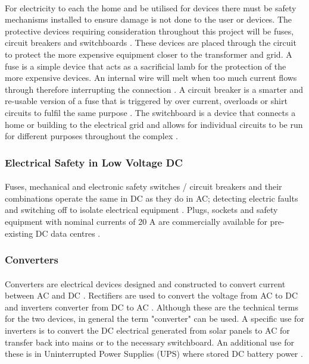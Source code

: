 \paragraph{}
For electricity to each the home and be utilised for devices there must be safety mechanisms installed to ensure damage is not done to the user or devices. The protective devices requiring consideration throughout this project will be fuses, circuit breakers and switchboards \cite{UnitedStatesDepartmentoftheInterior2000}. These devices are placed through the circuit to protect the more expensive equipment closer to the transformer and grid. A fuse is a simple device that acts as a sacrificial lamb for the protection of the more expensive devices. An internal wire will melt when too much current flows through therefore interrupting the connection \cite{UnitedStatesDepartmentoftheInterior2000}. A circuit breaker is a smarter and re-usable version of a fuse that is triggered by over current, overloads or shirt circuits to fulfil the same purpose \cite{UnitedStatesDepartmentoftheInterior2000}. The switchboard is a device that connects a home or building to the electrical grid and allows for individual circuits to be run for different purposes throughout the complex \cite{UnitedStatesDepartmentoftheInterior2000}.

\subsubsection{Electrical Safety in Low Voltage DC}

\paragraph{}
Fuses, mechanical and electronic safety switches / circuit breakers and their combinations operate the same in DC as they do in AC; detecting electric faults and switching off to isolate electrical equipment \cite{Meckler2014}. Plugs, sockets and safety equipment with nominal currents of 20 \si{A} are commercially available for pre-existing DC data centres \cite{Meckler2014}. 

\subsubsection{Converters}

\paragraph{}
Converters are electrical devices designed and constructed to convert current between AC and DC \cite{website:ConvVsInverter}. Rectifiers are used to convert the voltage from AC to DC and inverters converter from DC to AC \cite{website:ConvVsInverter}. Although these are the technical terms for the two devices, in general the term "converter" can be used. A specific use for inverters is to convert the DC electrical generated from solar panels to AC for transfer back into mains or to the necessary switchboard. An additional use for these is in Uninterrupted Power Supplies (UPS) where stored DC battery power \cite{website:ConvVsInverter}.

